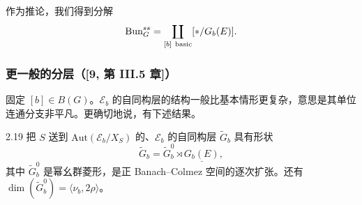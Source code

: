 作为推论，我们得到分解
\[
\Bun_G^{ss}=\coprod_{[b]\ \mathrm{basic}}[*/G_b(E)].
\]

\subsubsection{更一般的分层（[9, 第 III.5 章]）}

固定 $[b]\in B(G)$。$\mathcal E_b$ 的自同构层的结构一般比基本情形更复杂，意思是其单位连通分支非平凡。更确切地说，有下述结果。

\begin{thm}{2.19}
把 $S$ 送到 $\mathrm{Aut}(\mathcal E_b/X_S)$ 的、$\mathcal E_b$ 的自同构层 $\widetilde G_b$ 具有形状
\[
\widetilde G_b=\widetilde G_b^0\rtimes\underline{G_b(E)},
\]
其中 $\widetilde G_b^0$ 是幂幺群菱形，是正 Banach–Colmez 空间的逐次扩张。还有 $\dim(\widetilde G_b^0)=\langle\nu_b,2\rho\rangle$。
\label{thm:a3-2-19}
\end{thm}
